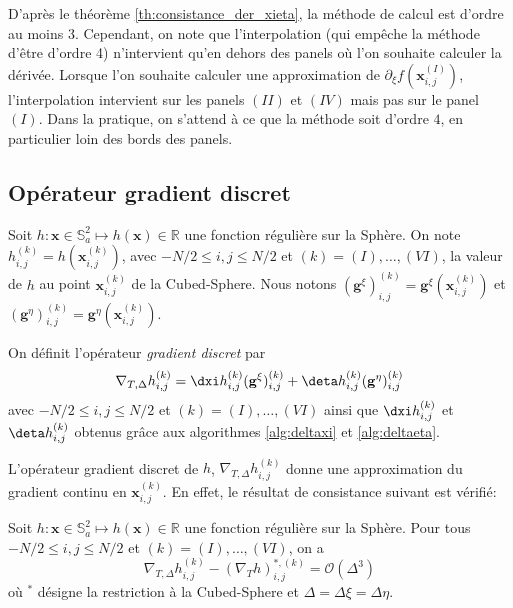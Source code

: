 D'après le théorème \ref{th:consistance_der_xieta}, la méthode de calcul est d'ordre au moins 3. Cependant, on note que l'interpolation (qui empêche la méthode d'être d'ordre 4) n'intervient qu'en dehors des panels où l'on souhaite calculer la dérivée.
Lorsque l'on souhaite calculer une approximation de $\partial_{\xi}f(\mathbf{x}_{i,j}^{(I)})$, l'interpolation intervient sur les panels $(II)$ et $(IV)$ mais pas sur le panel $(I)$. Dans la pratique, on s'attend à ce que la méthode soit d'ordre $4$, en particulier loin des bords des panels.









\subsection{Opérateur gradient discret}

Soit $h : \mathbf{x} \in \mathbb{S}_a^2 \mapsto h(\mathbf{x}) \in \mathbb{R}$ une fonction régulière sur la Sphère. On note $h_{i,j}^{(k)} = h(\mathbf{x}_{i,j}^{(k)})$, avec $-N/2 \leq i,j \leq N/2$ et $(k) = (I) , \ldots , (VI)$, la valeur de $h$ au point $\mathbf{x}_{i,j}^{(k)}$ de la Cubed-Sphere.
Nous notons $( \mathbf{g}^{\xi} )_{i,j}^{(k)} = \mathbf{g}^{\xi} (\mathbf{x}_{i,j}^{(k)})$ et $( \mathbf{g}^{\eta} )_{i,j}^{(k)} = \mathbf{g}^{\eta} (\mathbf{x}_{i,j}^{(k)})$.

\begin{definition}
On définit l'opérateur \textit{gradient discret} par 
\begin{equation}
\nabla_{T,\Delta} h_{i,j}^{(k)} = \dxi h_{i,j}^{(k)} ( \mathbf{g}^{\xi} )_{i,j}^{(k)} + \deta h_{i,j}^{(k)} ( \mathbf{g}^{\eta} )_{i,j}^{(k)}
\end{equation}
avec $-N/2 \leq i,j \leq N/2$ et $(k) = (I), \ldots , (VI)$ ainsi que $\dxi h_{i,j}^{(k)}$ et $\deta h_{i,j}^{(k)}$ obtenus grâce aux algorithmes \ref{alg:deltaxi} et \ref{alg:deltaeta}.
\label{def:gradient_disc}
\end{definition}
L'opérateur gradient discret de $h$, $\nabla_{T,\Delta} h_{i,j}^{(k)}$ donne une approximation du gradient continu en $\mathbf{x}_{i,j}^{(k)}$. En effet, le résultat de consistance suivant est vérifié:

\begin{proposition}
Soit $h : \mathbf{x} \in \mathbb{S}_a^2 \mapsto h(\mathbf{x}) \in \mathbb{R}$ une fonction régulière sur la Sphère. Pour tous $-N/2 \leq i,j \leq N/2$ et $(k)=(I), \ldots , (VI)$, on a
\begin{equation}
\nabla_{T,\Delta} h_{i,j}^{(k)} - (\nabla_T h)^{*,(k)}_{i,j} = \mathcal{O} \left( \Delta^3 \right)
\end{equation}
où $^*$ désigne la restriction à la Cubed-Sphere et $\Delta = \Delta \xi = \Delta \eta$. 
\label{prop:accuracy_gradient}
\end{proposition}

